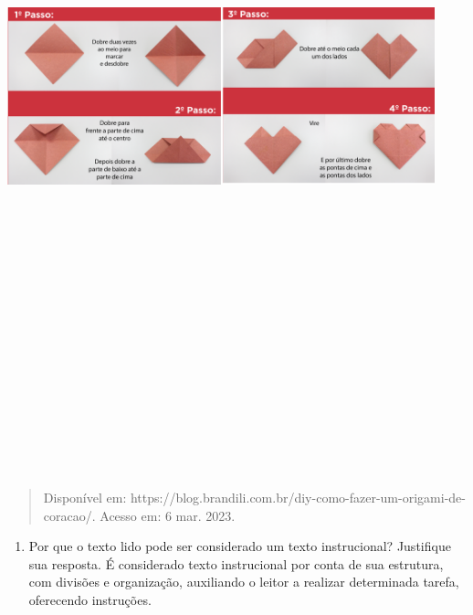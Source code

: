 \begin{itemize}
{{{\begin{itemize}
\includegraphics[width=4.87700in,height=8.57778in]{media/image11.png}

\begin{quote}
Disponível em:
https://blog.brandili.com.br/diy-como-fazer-um-origami-de-coracao/.
Acesso em: 6 mar. 2023.
\end{quote}

\begin{enumerate}
\def\labelenumi{\alph{enumi})}
\item
  Por que o texto lido pode ser considerado um texto instrucional?
  Justifique sua resposta. É considerado texto instrucional por conta de
  sua estrutura, com divisões e organização, auxiliando o leitor a
  realizar determinada tarefa, oferecendo instruções.
\end{enumerate}


\end{itemize}}}}
\end{itemize}
